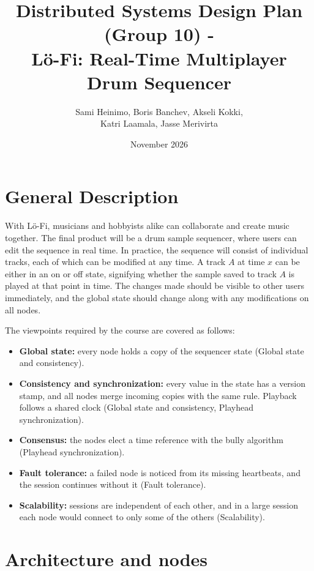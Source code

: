 \documentclass{article}
\title{Distributed Systems Design Plan (Group 10) - \\
    Lö-Fi: Real-Time Multiplayer Drum Sequencer}
\author{Sami Heinimo, Boris Banchev, Akseli Kokki,\\
    Katri Laamala, Jasse Merivirta}
\date{November 2026}
\begin{document}
\maketitle

\newpage
\tableofcontents
\newpage

\section{General Description}

With Lö-Fi, musicians and hobbyists alike can collaborate and create music together. The final product will be a drum sample sequencer, where users can edit the sequence in real time. In practice, the sequence will consist of individual tracks, each of which can be modified at any time. A track $A$ at time $x$ can be either in an on or off state, signifying whether the sample saved to track $A$ is played at that point in time. The changes made should be visible to other users immediately, and the global state should change along with any modifications on all nodes.

The viewpoints required by the course are covered as follows:

\begin{itemize}
    \setlength{\itemsep}{0pt}
    \item \textbf{Global state:} every node holds a copy of the sequencer state (Global state and consistency).
    \item \textbf{Consistency and synchronization:} every value in the state has a version stamp, and all nodes merge incoming copies with the same rule. Playback follows a shared clock (Global state and consistency, Playhead synchronization).
    \item \textbf{Consensus:} the nodes elect a time reference with the bully algorithm (Playhead synchronization).
    \item \textbf{Fault tolerance:} a failed node is noticed from its missing heartbeats, and the session continues without it (Fault tolerance).
    \item \textbf{Scalability:} sessions are independent of each other, and in a large session each node would connect to only some of the others (Scalability).
\end{itemize}

\section{Architecture and nodes}
\end{document}
